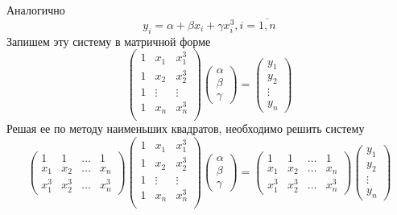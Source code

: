 \documentclass[professionalfonts,compress,unicode]{beamer}
\begin{document}
{
	Аналогично
	$$ y_i = \alpha + \beta x_i + \gamma x_i^3, i = \overline{1,n}$$
	Запишем эту систему в матричной форме
	$$
	\begin{pmatrix}
		1&x_1&x_1^3\\
		1&x_2&x_2^3\\
		1&\vdots&\vdots\\
		1&x_n&x_n^3\\
	\end{pmatrix}
	\begin{pmatrix}
		\alpha\\\beta\\\gamma
	\end{pmatrix} = 
	\begin{pmatrix}
		y_1\\y_2\\\vdots\\y_n
	\end{pmatrix}
	$$
	Решая ее по методу наименьших квадратов, необходимо решить систему
	$$
	\begin{pmatrix}
		1&1&\dots&1\\
		x_1&x_2&\dots&x_n\\
		x_1^3&x_2^3&\dots&x_n^3
	\end{pmatrix}
	\begin{pmatrix}
		1&x_1&x_1^3\\
		1&x_2&x_2^3\\
		1&\vdots&\vdots\\
		1&x_n&x_n^3\\
	\end{pmatrix}
	\begin{pmatrix}
		\alpha\\\beta\\\gamma
	\end{pmatrix} = 
	\begin{pmatrix}
		1&1&\dots&1\\
		x_1&x_2&\dots&x_n\\
		x_1^3&x_2^3&\dots&x_n^3
	\end{pmatrix}
	\begin{pmatrix}
		y_1\\y_2\\\vdots\\y_n
	\end{pmatrix}
	$$	
}
\end{document}
